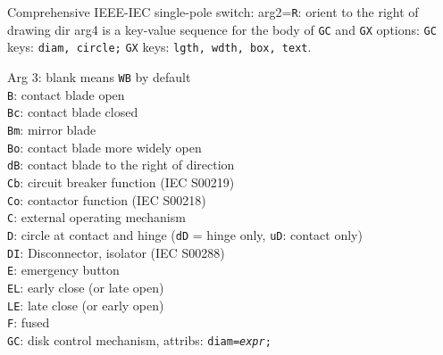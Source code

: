   {
                                 Comprehensive IEEE-IEC single-pole switch:
                                 arg2={\tt R}: orient to the right of
                                     drawing dir
                                 arg4 is a key-value sequence for the body of
                                 {\tt GC} and {\tt GX} options:
                                   {\tt GC} keys: {\tt diam, circle;}%
                                   {\tt GX} keys: {\tt lgth, wdth, box, text}.
\par
                                 Arg 3:
                                   blank means {\tt WB} by default\\
                                   {\tt B}: contact blade open\\
                                   {\tt Bc}: contact blade closed\\
                                   {\tt Bm}: mirror blade\\
                                   {\tt Bo}: contact blade more widely open\\
                                   {\tt dB}: contact blade to the right of
                                     direction\\
                                   {\tt Cb}: circuit breaker function 
                                     (IEC S00219)\\
                                   {\tt Co}: contactor function (IEC S00218)\\
                                   {\tt C}: external operating mechanism\\
                                   {\tt D}: circle at contact and hinge
                                      ({\tt dD} = hinge only,
                                       {\tt uD}: contact only)\\
                                   {\tt DI}: Disconnector, isolator
                                     (IEC S00288)\\
                                   {\tt E}: emergency button\\
                                   {\tt EL}: early close (or late open)\\
                                   {\tt LE}: late close (or early open)\\
                                   {\tt F}: fused\\
                                   {\tt GC}: disk control mechanism, attribs:
                                    {\tt diam={\sl expr};
}}
